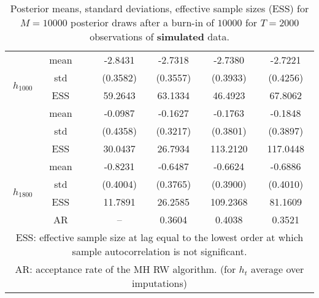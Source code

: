 {\begin{table}
\begin{tabular}{ccc cc cc}
\multirow{4}{*}{$h_{1000}$}   & mean &   & -2.8431  & -2.7318  & -2.7380  & -2.7221  \\ [0.75ex]
 & std &   & (0.3582)  & (0.3557)  & (0.3933)  & (0.4256)  \\ [0.75ex]
 & ESS  &   & 59.2643  & 63.1334  & 46.4923  & 67.8062  \\ [1.3ex] 
\multirow{4}{*}{$h_{1400}$}   & mean &   & -0.0987  & -0.1627  & -0.1763  & -0.1848  \\ [0.75ex]
 & std &   & (0.4358)  & (0.3217)  & (0.3801)  & (0.3897)  \\ [0.75ex]
 & ESS  &   & 30.0437  & 26.7934  & 113.2120  & 117.0448  \\ [1.3ex] 
\multirow{4}{*}{$h_{1800}$}   & mean &   & -0.8231  & -0.6487  & -0.6624  & -0.6886  \\ [0.75ex]
 & std &   & (0.4004)  & (0.3765)  & (0.3900)  & (0.4010)  \\ [0.75ex]
 & ESS  &   & 11.7891  & 26.2585  & 109.2368  & 81.1609  \\ [1.3ex] 
 & AR & & --  & 0.3604  & 0.4038  & 0.3521 \\ \hline 
\hline 
\multicolumn{7}{p{11cm}}{\footnotesize{ESS: effective sample size at lag equal to the lowest order at which sample autocorrelation is not significant.}}  \\ 
\multicolumn{7}{p{11cm}}{\footnotesize{AR: acceptance rate of the MH RW algorithm. (for $h_{t}$ average over imputations)}}  \\ 
\end{tabular}
 \caption{Posterior means, standard deviations, effective sample sizes (ESS)  for $M=10000$ posterior draws after a burn-in of $10000$ for $T=2000$ observations of \textbf{simulated} data.}
\label{tab:SV_results}  
\end{table}
}